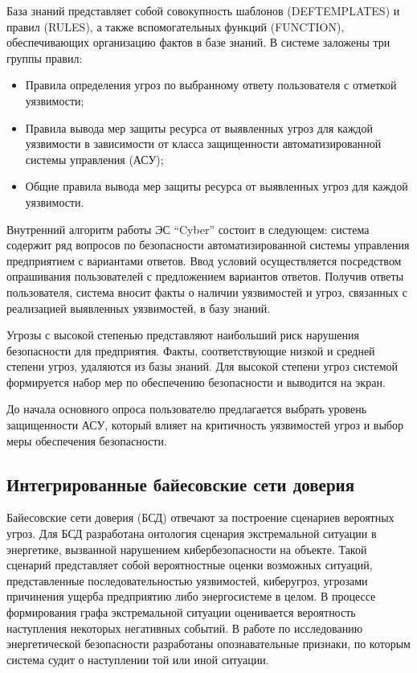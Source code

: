 База знаний представляет собой совокупность шаблонов (DEFTEMPLATES) и правил (RULES), а
также вспомогательных функций (FUNCTION), обеспечивающих организацию фактов в базе знаний.
В системе заложены три группы правил:
\begin{itemize}
    \item Правила определения угроз по выбранному ответу пользователя с отметкой уязвимости;
    \item Правила вывода мер защиты ресурса от выявленных угроз для каждой уязвимости в
    зависимости от класса защищенности автоматизированной системы управления (АСУ);
    \item Общие правила вывода мер защиты ресурса от выявленных угроз для каждой уязвимости.
\end{itemize}

Внутренний алгоритм работы  ЭС ``Cyber'' состоит в следующем: система содержит ряд вопросов
по безопасности автоматизированной системы управления предприятием с вариантами ответов.
Ввод условий осуществляется посредством опрашивания пользователей с предложением вариантов ответов.
Получив ответы пользователя, система вносит факты о наличии уязвимостей и угроз, связанных с
реализацией выявленных уязвимостей, в базу знаний.

Угрозы с высокой степенью представляют наибольший риск нарушения безопасности для предприятия.
Факты, соответствующие низкой и средней степени угроз, удаляются из базы знаний. Для высокой
степени угроз системой формируется набор мер по обеспечению безопасности и выводится на экран.

До начала основного опроса пользователю предлагается выбрать уровень защищенности АСУ, который
влияет на критичность уязвимостей угроз и выбор меры обеспечения безопасности.

\subsection{Интегрированные байесовские сети доверия}
Байесовские сети доверия (БСД) отвечают за построение сценариев вероятных угроз. Для БСД
разработана онтология сценария экстремальной ситуации в энергетике, вызванной нарушением
кибербезопасности на объекте. Такой сценарий представляет собой вероятностные оценки возможных
ситуаций, представленные последовательностью уязвимостей, киберугроз, угрозами причинения ущерба
предприятию либо энергосистеме в целом. В процессе формирования графа экстремальной ситуации
оценивается вероятность наступления некоторых негативных событий. В работе по исследованию
энергетической безопасности \cite{secur} разработаны опознавательные признаки, по которым система судит о наступлении
той или иной ситуации.

